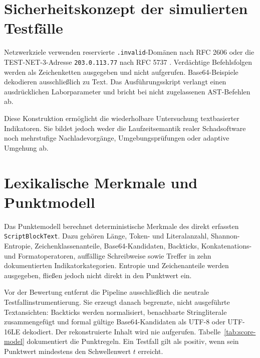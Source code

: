 \documentclass[12pt,a4paper,oneside,parskip=half]{scrreprt}
\begin{document}
\section{Sicherheitskonzept der simulierten Testfälle}
Netzwerkziele verwenden reservierte \texttt{.invalid}-Domänen nach RFC 2606 oder die TEST-NET-3-Adresse \texttt{203.0.113.77} nach RFC 5737 \cite{rfc2606,rfc5737}. Verdächtige Befehlsfolgen werden als Zeichenketten ausgegeben und nicht aufgerufen. Base64-Beispiele dekodieren ausschließlich zu Text. Das Ausführungsskript verlangt einen ausdrücklichen Laborparameter und bricht bei nicht zugelassenen AST-Befehlen ab.

Diese Konstruktion ermöglicht die wiederholbare Untersuchung textbasierter Indikatoren. Sie bildet jedoch weder die Laufzeitsemantik realer Schadsoftware noch mehrstufige Nachladevorgänge, Umgebungsprüfungen oder adaptive Umgehung ab.
\section{Lexikalische Merkmale und Punktmodell}
Das Punktemodell berechnet deterministische Merkmale des direkt erfassten \texttt{ScriptBlockText}. Dazu gehören Länge, Token- und Literalanzahl, Shannon-Entropie, Zeichenklassenanteile, Base64-Kandidaten, Backticks, Konkatenations- und Formatoperatoren, auffällige Schreibweise sowie Treffer in zehn dokumentierten Indikatorkategorien. Entropie und Zeichenanteile werden ausgegeben, fließen jedoch nicht direkt in den Punktwert ein.

Vor der Bewertung entfernt die Pipeline ausschließlich die neutrale Testfallinstrumentierung. Sie erzeugt danach begrenzte, nicht ausgeführte Textansichten: Backticks werden normalisiert, benachbarte Stringliterale zusammengefügt und formal gültige Base64-Kandidaten als UTF-8 oder UTF-16LE dekodiert. Der rekonstruierte Inhalt wird nie aufgerufen. Tabelle~\ref{tab:score-model} dokumentiert die Punktregeln. Ein Testfall gilt als positiv, wenn sein Punktwert mindestens den Schwellenwert \(t\) erreicht.
\end{document}
